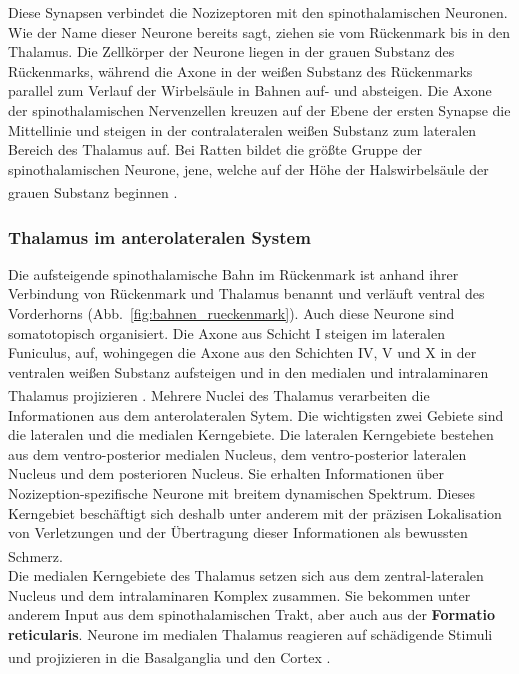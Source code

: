 \documentclass[12pt,a4paper,pdftex]{article}
\begin{document}
\newpage
Diese Synapsen verbindet die Nozizeptoren mit den spinothalamischen Neuronen. Wie der Name dieser Neurone bereits sagt, ziehen sie vom Rückenmark bis in den Thalamus. Die Zellkörper der Neurone liegen in der grauen Substanz des Rückenmarks, während die Axone in der weißen Substanz des Rückenmarks parallel zum Verlauf der Wirbelsäule in Bahnen auf- und absteigen. Die Axone der spinothalamischen Nervenzellen kreuzen auf der Ebene der ersten Synapse die Mittellinie und steigen in der contralateralen weißen Substanz zum lateralen Bereich des Thalamus auf. Bei Ratten bildet die größte Gruppe der spinothalamischen Neurone, jene, welche auf der Höhe der Halswirbelsäule der grauen Substanz beginnen \textsuperscript{\cite[25]{paxinos2014rat}}.


\subsubsection*{Thalamus im anterolateralen System}
Die aufsteigende spinothalamische Bahn  im Rückenmark ist anhand ihrer Verbindung von Rückenmark und Thalamus benannt und verläuft ventral des Vorderhorns  (Abb.~\ref{fig:bahnen_rueckenmark}). Auch diese Neurone sind somatotopisch organisiert. Die Axone aus Schicht I steigen im lateralen Funiculus, auf, wohingegen die Axone aus den Schichten IV, V und X in der ventralen weißen Substanz aufsteigen und in den medialen und intralaminaren Thalamus projizieren \textsuperscript{\cite[25]{paxinos2014rat}}. 
Mehrere Nuclei des Thalamus verarbeiten die Informationen aus dem anterolateralen Sytem. Die wichtigsten zwei Gebiete sind die lateralen und die medialen Kerngebiete. 
Die lateralen Kerngebiete bestehen aus dem ventro-posterior medialen Nucleus, dem ventro-posterior lateralen Nucleus und dem posterioren Nucleus. Sie erhalten Informationen über Nozizeption-spezifische Neurone mit breitem dynamischen Spektrum. Dieses Kerngebiet beschäftigt sich deshalb unter anderem mit der präzisen Lokalisation von Verletzungen und der Übertragung dieser Informationen als bewussten Schmerz\textsuperscript{\cite[24]{kandel2013principles}}.
\\
\noindent Die medialen Kerngebiete des Thalamus setzen sich aus dem zentral-lateralen Nucleus und dem intralaminaren Komplex zusammen. Sie bekommen unter anderem Input aus dem spinothalamischen Trakt, aber auch aus der \textbf{Formatio reticularis}. Neurone im medialen Thalamus reagieren auf schädigende Stimuli und projizieren in die Basalganglia und den Cortex \textsuperscript{\cite[24]{kandel2013principles}}.
\end{document}
